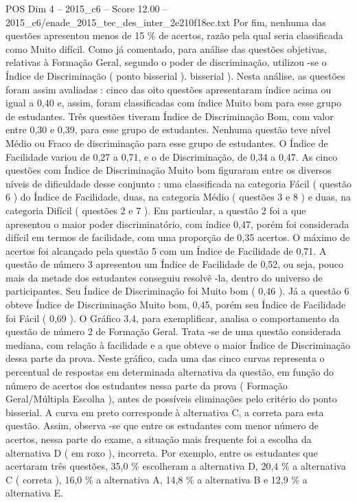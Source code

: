\begin{textsample}{POS Dim 4 – 2015\_c6 – Score 12.00 – 2015\_c6/enade\_2015\_tec\_des\_inter\_2e210f18ec.txt}
Por fim, nenhuma das questões apresentou menos de 15 \% de acertos, razão pela qual seria classificada como Muito difícil.
Como já comentado, para análise das questões objetivas, relativas à Formação Geral, segundo o poder de discriminação, utilizou -se o Índice de Discriminação ( ponto bisserial ). bisserial ).
Nesta análise, as questões foram assim avaliadas : cinco das oito questões apresentaram índice acima ou igual a 0,40 e, assim, foram classificadas com índice Muito bom para esse grupo de estudantes.
Três questões tiveram Índice de Discriminação Bom, com valor entre 0,30 e 0,39, para esse grupo de estudantes.
Nenhuma questão teve nível Médio ou Fraco de discriminação para esse grupo de estudantes.
O Índice de Facilidade variou de 0,27 a 0,71, e o de Discriminação, de 0,34 a 0,47.
As cinco questões com Índice de Discriminação Muito bom figuraram entre os diversos níveis de dificuldade desse conjunto : uma classificada na categoria Fácil ( questão 6 ) do Índice de Facilidade, duas, na categoria Médio ( questões 3 e 8 ) e duas, na categoria Difícil ( questões 2 e 7 ).
Em particular, a questão 2 foi a que apresentou o maior poder discriminatório, com índice 0,47, porém foi considerada difícil em termos de facilidade, com uma proporção de 0,35 acertos.
O máximo de acertos foi alcançado pela questão 5 com um Índice de Facilidade de 0,71.
A questão de número 3 apresentou um Índice de Facilidade de 0,52, ou seja, pouco mais da metade dos estudantes conseguiu resolvê -la, dentro do universo de participantes.
Seu Índice de Discriminação foi Muito bom ( 0,46 ).
Já a questão 6 obteve Índice de Discriminação Muito bom, 0,45, porém seu Índice de Facilidade foi Fácil ( 0,69 ).
O Gráfico 3.4, para exemplificar, analisa o comportamento da questão de número 2 de Formação Geral.
Trata -se de uma questão considerada mediana, com relação à facilidade e a que obteve o maior Índice de Discriminação dessa parte da prova.
Neste gráfico, cada uma das cinco curvas representa o percentual de respostas em determinada alternativa da questão, em função do número de acertos dos estudantes nessa parte da prova ( Formação Geral/Múltipla Escolha ), antes de possíveis eliminações pelo critério do ponto bisserial.
A curva em preto corresponde à alternativa C, a correta para esta questão.
Assim, observa -se que entre os estudantes com menor número de acertos, nessa parte do exame, a situação mais frequente foi a escolha da alternativa D ( em roxo ), incorreta.
Por exemplo, entre os estudantes que acertaram três questões, 35,0 \% escolheram a alternativa D, 20,4 \% a alternativa C ( correta ), 16,0 \% a alternativa A, 14,8 \% a alternativa B e 12,9 \% a alternativa E.

\end{textsample}
